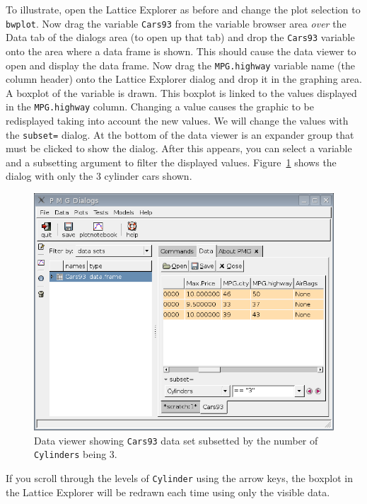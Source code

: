 \documentclass[12pt]{article}
\newcommand{\RCode}[1]{\texttt{#1}}
\begin{document}
To illustrate, open the Lattice Explorer as before and change the plot
selection to \RCode{bwplot}. Now drag the variable \RCode{Cars93} from
the variable browser area \textit{over} the Data tab of the dialogs
area (to open up that tab) and drop the \RCode{Cars93} variable onto
the area where a data frame is shown. This should cause the data
viewer to open and display the data frame. Now drag the
\RCode{MPG.highway} variable name (the column header) onto the Lattice
Explorer dialog and drop it in the graphing area. A boxplot of the
variable is drawn. This boxplot is linked to the values displayed in
the \RCode{MPG.highway} column. Changing a value causes the graphic to
be redisplayed taking into account the new values. We will change the
values with the \RCode{subset=} dialog. At the bottom of the data
viewer is an expander group that must be clicked to show the dialog.
After this appears, you can select a variable and a subsetting
argument to filter the displayed values.
Figure~\ref{fig:data-viewer-with-subset} shows the dialog with only
the 3 cylinder cars shown.

\begin{figure}[htbp]
  \centering
  \includegraphics{data-viewer-with-subset}
  \caption{Data viewer showing \RCode{Cars93} data set subsetted by the number of \RCode{Cylinders} being 3.}
  \label{fig:data-viewer-with-subset}
\end{figure}

If you scroll through the levels of \RCode{Cylinder} using the arrow
keys, the boxplot in the Lattice Explorer will be redrawn each time
using only the visible data.
\end{document}
